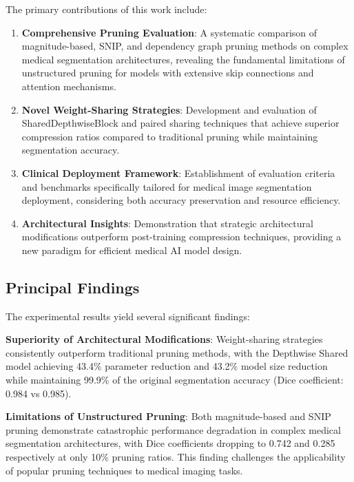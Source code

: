 \documentclass[12pt,a4paper]{article}
\begin{document}
\begin{enumerate}
The primary contributions of this work include:

\begin{enumerate}
\item \textbf{Comprehensive Pruning Evaluation}: A systematic comparison of magnitude-based, SNIP, and dependency graph pruning methods on complex medical segmentation architectures, revealing the fundamental limitations of unstructured pruning for models with extensive skip connections and attention mechanisms.

\item \textbf{Novel Weight-Sharing Strategies}: Development and evaluation of SharedDepthwiseBlock and paired sharing techniques that achieve superior compression ratios compared to traditional pruning while maintaining segmentation accuracy.

\item \textbf{Clinical Deployment Framework}: Establishment of evaluation criteria and benchmarks specifically tailored for medical image segmentation deployment, considering both accuracy preservation and resource efficiency.

\item \textbf{Architectural Insights}: Demonstration that strategic architectural modifications outperform post-training compression techniques, providing a new paradigm for efficient medical AI model design.
\end{enumerate}

\subsection{Principal Findings}

The experimental results yield several significant findings:

\textbf{Superiority of Architectural Modifications}: Weight-sharing strategies consistently outperform traditional pruning methods, with the Depthwise Shared model achieving 43.4\% parameter reduction and 43.2\% model size reduction while maintaining 99.9\% of the original segmentation accuracy (Dice coefficient: 0.984 vs 0.985).

\textbf{Limitations of Unstructured Pruning}: Both magnitude-based and SNIP pruning demonstrate catastrophic performance degradation in complex medical segmentation architectures, with Dice coefficients dropping to 0.742 and 0.285 respectively at only 10\% pruning ratios. This finding challenges the applicability of popular pruning techniques to medical imaging tasks.


\end{enumerate}
\end{document}
